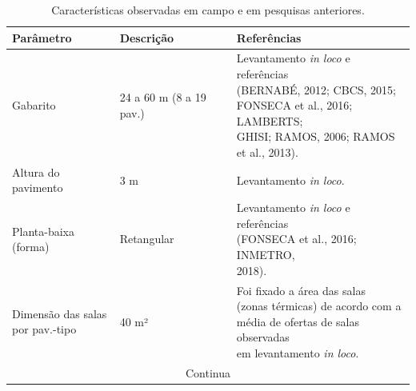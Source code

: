     \begin{table}[H]
        \centering
        \small
        \caption{Características observadas em campo e em pesquisas anteriores.}
        \begin{tabular*}{\columnwidth}{@{\extracolsep{\fill}}lll}
        \hline
        \textbf{Parâmetro}                                             & \textbf{Descrição}                                                                    & \textbf{Referências} \\ \hline
        Gabarito                                                       & 24 a 60 m (8 a 19 pav.)                                                               & \makecell[l]{Levantamento \textit{in loco} e referências\\ (BERNABÉ, 2012; CBCS, 2015; \\FONSECA et al., 2016; LAMBERTS; \\GHISI; RAMOS, 2006; RAMOS \\et al., 2013).} \\ \hline
        Altura do pavimento                                            & 3 m                                                                                   & Levantamento \textit{in loco}.                                                                                                                                         \\ \hline
        Planta-baixa (forma)                                           & Retangular                                                                            & \makecell[l]{Levantamento \textit{in loco} e referências\\ (FONSECA et al., 2016; INMETRO,\\ 2018).}                                                                   \\ \hline
        \makecell[l]{Dimensão das salas\\ por pav.-tipo}               & 40 m²                                                                                 & \makecell[l]{Foi fixado a área das salas \\(zonas térmicas) de acordo com a \\média de ofertas de salas observadas\\ em levantamento \textit{in loco}.}                  \\ \hline
        \multicolumn{3}{c}{Continua}\\\hline
    \end{tabular*}
    \label{tab:tabela4}
    \end{table}\pagebreak
